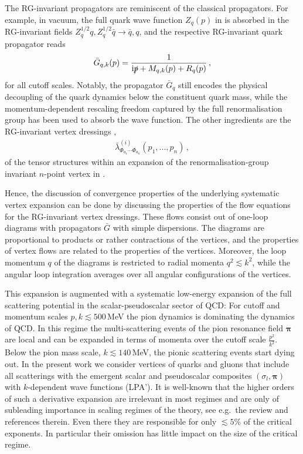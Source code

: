 \documentclass[aps,twocolumn,prd,superscriptaddress]{revtex4-2}
\begin{document}
The RG-invariant propagators are reminiscent of the classical propagators. For example, in vacuum, the full quark wave function $Z_q(p)$ in  is absorbed in the RG-invariant fields $Z_q^{1/2} q,Z_q^{1/2} \bar q \to \bar q, q$, and the respective RG-invariant quark propagator reads 
%
\begin{align}
	\bar G_{q,k}(p) = \frac{1}{{\textrm{i}} \slashed p + M_{q,k}(p)+R_q(p)}\,,
	\label{eq:barGq}
\end{align}
%
for all cutoff scales. Notably, the propagator $\bar G_q$ still encodes the physical decoupling of the quark dynamics below the constituent quark mass, while the momentum-dependent rescaling freedom captured by the full renormalisation group has been used to absorb the wave function. The other ingredients are the RG-invariant vertex dressings , 
%
\begin{align} 
	\bar \lambda_{\Phi_{a_1}\cdots \Phi_{a_n}}^{(i)}(p_1,...,p_n)\,,
	\label{eq:barLambdaSystematics}
\end{align}
%
of the tensor structures within an expansion of the renormalisation-group invariant $n$-point vertex in .

Hence, the discussion of convergence properties of the underlying systematic vertex expansion can be done by discussing the properties of the flow equations for the RG-invariant vertex dressings. These flows consist out of one-loop diagrams with propagators $\bar G$ with simple dispersions. The diagrams are proportional to products or rather contractions of the vertices, and the properties of vertex flows are related to the properties of the vertices. Moreover, the loop momentum $q$ of the diagrams is restricted to radial momenta $q^2\lesssim k^2$, while the angular loop integration averages over all angular configurations of the vertices. 

This expansion is augmented with a systematic low-energy expansion of the full scattering potential in the scalar-pseudoscalar sector of QCD: For cutoff and momentum scales $p,k\lesssim 500$\,MeV the pion dynamics is dominating the dynamics of QCD. In this regime the multi-scattering events of the pion resonance field $\boldsymbol{\pi}$ are local and can be expanded in terms of momenta over the cutoff scale
$\frac{p^2}{k^2}$. Below the pion mass scale, $k\lesssim 140$\,MeV, the pionic scattering events start dying out. In the present work we consider vertices of quarks and gluons that include all scatterings with the emergent scalar and pseudoscalar composites $(\sigma_l, \boldsymbol{\pi})$ with $k$-dependent wave functions (LPA'). It is well-known that the higher orders of such a derivative expansion are irrelevant in most regimes and are only of subleading importance in scaling regimes of the theory, see e.g.~the review \cite{Dupuis:2020fhh} and references therein. Even there they are responsible for only $\lesssim 5\%$ of the critical exponents. In particular their omission has little impact on the size of the critical regime. 
\end{document}
